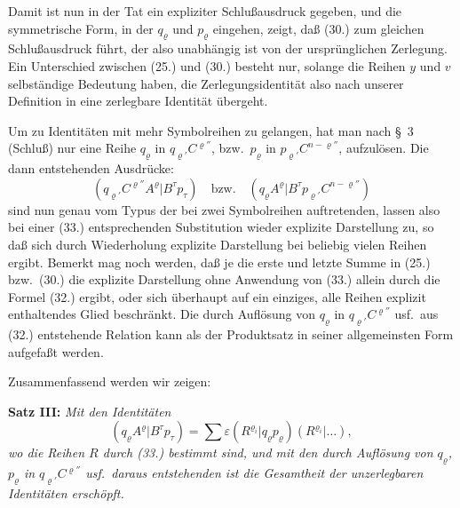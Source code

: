 \documentclass[12pt,a4paper]{article}
\begin{document}
Damit ist nun in der Tat ein expliziter Schlußausdruck gegeben, und die symmetrische Form, in der $q_{\varrho}$ und $p_{\varrho}$ eingehen, zeigt, daß (30.) zum gleichen Schlußausdruck führt, der also unabhängig ist von der ursprünglichen Zerlegung. Ein Unterschied zwischen (25.) und (30.) besteht nur, solange die Reihen $y$ und $v$ selbständige Bedeutung haben, die Zerlegungsidentität also nach unserer Definition in eine zerlegbare Identität übergeht.

Um zu Identitäten mit mehr Symbolreihen zu gelangen, hat man nach \S\ 3 (Schluß) nur eine Reihe $q_{\varrho}$ in $q_{\varrho'} C^{\varrho''}$, bzw.\ $p_{\varrho}$ in $p_{\varrho'} C^{n-\varrho''}$, aufzulösen. Die dann entstehenden Ausdrücke:
\begin{equation*}
(q_{\varrho'} C^{\varrho''} A^{\varrho} | B^{\tau} p_{\tau}) \quad \text{bzw.} \quad (q_{\varrho} A^{\varrho} | B^{\tau} p_{\varrho'} C^{n-\varrho''})
\end{equation*}
sind nun genau vom Typus der bei zwei Symbolreihen auftretenden, lassen also bei einer (33.) entsprechenden Substitution wieder explizite Darstellung zu, so daß sich durch Wiederholung explizite Darstellung bei beliebig vielen Reihen ergibt. Bemerkt mag noch werden, daß je die erste und letzte Summe in (25.) bzw.\ (30.) die explizite Darstellung ohne Anwendung von (33.) allein durch die Formel (32.) ergibt, oder sich überhaupt auf ein einziges, alle Reihen explizit enthaltendes Glied beschränkt. Die durch Auflösung von $q_{\varrho}$ in $q_{\varrho'} C^{\varrho''}$ usf.\ aus (32.) entstehende Relation kann als der Produktsatz in seiner allgemeinsten Form aufgefaßt werden.

Zusammenfassend werden wir zeigen:

\medskip
\textbf{Satz III:} \textit{Mit den Identitäten}
\begin{equation}\tag{36}
(q_{\varrho} A^{\varrho} | B^{\tau} p_{\tau}) = \sum \varepsilon (R^{\varrho_{i}} | q_{\varrho} p_{\varrho}) (R^{\varrho_{i}} | \ldots),
\end{equation}
\textit{wo die Reihen $R$ durch (33.) bestimmt sind, und mit den durch Auflösung von $q_{\varrho}$,$p_{\varrho}$ in $q_{\varrho'} C^{\varrho''}$ usf.\ daraus entstehenden ist die Gesamtheit der unzerlegbaren Identitäten erschöpft.}
\medskip
\end{document}
